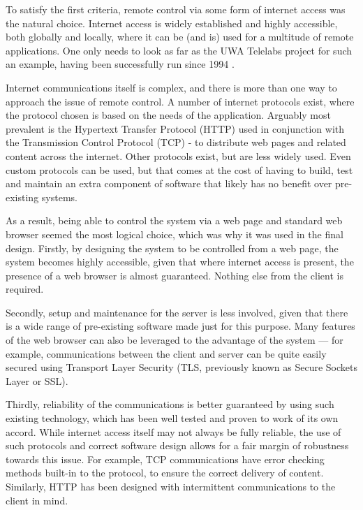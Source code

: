 To satisfy the first criteria, remote control via some form of internet access was the natural choice. Internet access is widely established and highly accessible, both globally and locally, where it can be (and is) used for a multitude of remote applications. One only needs to look as far as the UWA Telelabs project for such an example, having been successfully run since 1994 \cite{telelabs}.

Internet communications itself is complex, and there is more than one way to approach the issue of remote control. A number of internet protocols exist, where the protocol chosen is based on the needs of the application. Arguably most prevalent is the Hypertext Transfer Protocol (HTTP)\cite{rfc2616} used in conjunction with the Transmission Control Protocol (TCP) - to distribute web pages and related content across the internet. Other protocols exist, but are less widely used. Even custom protocols can be used, but that comes at the cost of having to build, test and maintain an extra component of software that likely has no benefit over pre-existing systems.

As a result, being able to control the system via a web page and standard web browser seemed the most logical choice, which was why it was used in the final design. Firstly, by designing the system to be controlled from a web page, the system becomes highly accessible, given that where internet access is present, the presence of a web browser is almost guaranteed. Nothing else from the client is required. 

Secondly, setup and maintenance for the server is less involved, given that there is a wide range of pre-existing software made just for this purpose. Many features of the web browser can also be leveraged to the advantage of the system --- for example, communications between the client and server can be quite easily secured using Transport Layer Security (TLS, previously known as Secure Sockets Layer or SSL).

Thirdly, reliability of the communications is better guaranteed by using such existing technology, which has been well tested and proven to work of its own accord. While internet access itself may not always be fully reliable, the use of such protocols and correct software design allows for a fair margin of robustness towards this issue. For example, TCP communications have error checking methods built-in to the protocol, to ensure the correct delivery of content. Similarly, HTTP has been designed with intermittent communications to the client in mind\cite{rfc2616}.

